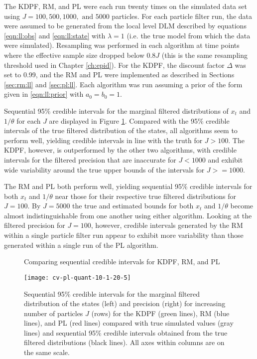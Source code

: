 The KDPF, RM, and PL were each run twenty times on the simulated data set using $J = 100, 500, 1000, \mbox{ and } 5000$ particles. For each particle filter run, the data were assumed to be generated from the local level DLM described by equations \eqref{eqn:ll:obs} and \eqref{eqn:ll:state} with $\lambda = 1$ (i.e. the true model from which the data were simulated). Resampling was performed in each algorithm at time points where the effective sample size dropped below $0.8J$ (this is the same resampling threshold used in Chapter \ref{ch:epid}). For the KDPF, the discount factor $\Delta$ was set to 0.99, and the RM and PL were implemented as described in Sections \ref{sec:rm:ll} and \ref{sec:pl:ll}. Each algorithm was run assuming a prior of the form given in \eqref{eqn:ll:prior} with $a_0 = b_0 = 1$.

Sequential 95\% credible intervals for the marginal filtered distributions of $x_t$ and $1/\theta$ for each $J$ are displayed in Figure \ref{fig:comp:quant}. Compared with the 95\% credible intervals of the true filtered distribution of the states, all algorithms seem to perform well, yielding credible intervals in line with the truth for $J > 100$. The KDPF, however, is outperformed by the other two algorithms, with credible intervals for the filtered precision that are inaccurate for $J < 1000$ and exhibit wide variability around the true upper bounds of the intervals for $J >= 1000$.

The RM and PL both perform well, yielding sequential 95\% credible intervals for both $x_t$ and $1/\theta$ near those for their respective true filtered distributions for $J = 100$. By $J = 5000$ the true and estimated bounds for both $x_t$ and $1/\theta$ become almost indistinguishable from one another using either algorithm. Looking at the filtered precision for $J = 100$, however, credible intervals generated by the RM within a single particle filter run appear to exhibit more variability than those generated within a single run of the PL algorithm.

\begin{figure}[ht]
\ssp
\centering
\caption{Comparing sequential credible intervals for KDPF, RM, and PL} \label{fig:comp:quant}
\texttt{[image: cv-pl-quant-10-1-20-5]}
\caption*{Sequential 95\% credible intervals for the marginal filtered distribution of the states (left) and precision (right) for increasing number of particles $J$ (rows) for the KDPF (green lines), RM (blue lines), and PL (red lines) compared with true simulated values (gray lines) and sequential 95\% credible intervals obtained from the true filtered distributions (black lines). All axes within columns are on the same scale.}
\end{figure}


